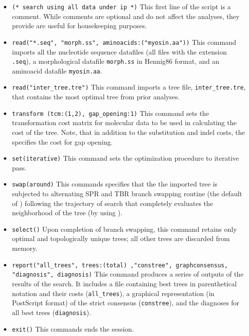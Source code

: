 \begin{itemize}
\item \texttt{(* search using all data under ip *)} This first line of the script is a comment. While comments are optional and do not affect the analyses, they provide are useful for housekeeping purposes.
\item \texttt{read("*.seq", "morph.ss", aminoacids:("myosin.aa"))} This command imports all the nucleotide sequence datafiles (all files with the extension \texttt{.seq}), a morphological datafile \texttt{morph.ss} in Hennig86 format, and an aminoacid datafile \texttt{myosin.aa}.
\item \texttt{read("inter\_tree.tre")} This command imports a tree file, \texttt{inter\_tree.tre}, that contains the most optimal tree from prior analyses. 
\item \texttt{transform (tcm:(1,2), gap\_opening:1)} This command sets the transformation cost matrix for molecular data to be used in calculating the cost of the tree. Note, that in addition to the substitution and indel costs, the  specifies the cost for gap opening.
\item \texttt{set(iterative)} This command sets the optimization procedure to iterative pass.
\item \texttt{swap(around)} This commands specifies that the the imported tree is subjected to alternating SPR and TBR branch swapping routine (the default of \poy) following the trajectory of search that completely evaluates the neighborhood of the tree (by using ).
\item \texttt{select()} Upon completion of branch swapping, this command retains only optimal and topologically unique trees; all other trees are discarded from memory.
\item \texttt{report("all\_trees", trees:(total) ,"constree", graphconsensus, "diagnosis", diagnosis)} This command produces a series of outputs of the results of the search. It includes a file containing best trees in parenthetical notation and their costs (\texttt{all\_trees}), a graphical representation (in PostScript format) of the strict consensus (\texttt{constree}), and the diagnoses for all best trees (\texttt{diagnosis}).
\item \texttt{exit()} This commands ends the \poy session.
\end{itemize}


